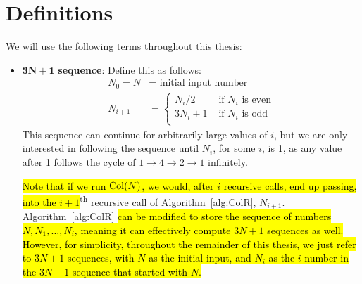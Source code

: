 \chapter{Definitions} \label{sec:defns}
We will use the following terms throughout this thesis:
\begin{itemize}
    \item $\boldsymbol{3N+1}$\textbf{ sequence}: Define this as follows: 
    \begin{align*}
        N_0 = N &= \text{ initial input number} \\
        N_{i+1} &= \begin{cases} 
        N_{i}/2 &\text{ if $N_i$ is even} \\
        3 N_{i} + 1 &\text{ if $N_i$ is odd} \\
        \end{cases}
    \end{align*}
    This sequence can continue for arbitrarily large values of $i$, but we are only interested in following the sequence until $N_i$, for some $i$, is 1, as any value after 1 follows the cycle of $1 \rightarrow 4 \rightarrow 2 \rightarrow 1$ infinitely. \par
    \hl{Note that if we run $\mathrm{Col}(N)$, we would, after $i$ recursive calls, end up passing, into the $i+1$}\textsuperscript{th} recursive call of Algorithm~\ref{alg:ColR}, $N_{i+1}$. Algorithm~\ref{alg:ColR} \hl{can be modified to store the sequence of numbers $N, N_1, \ldots, N_i$, meaning it can effectively compute $3N+1$ sequences as well. However, for simplicity, throughout the remainder of this thesis, we just refer to $3N+1$ sequences, with $N$ as the initial input, and $N_i$ as the $i$ number in the $3N+1$ sequence that started with $N$.}


\end{itemize}
